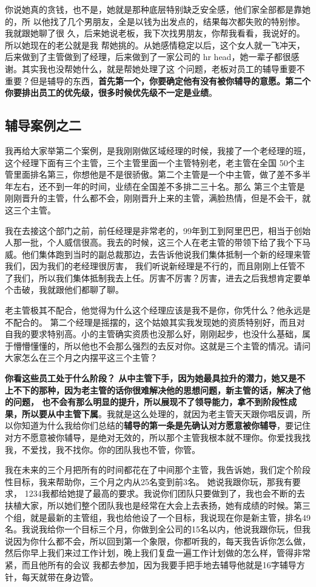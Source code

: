 \documentclass[12pt]{article}
\begin{document}
你说她真的贪钱，也不是，她就是那种底层特别缺乏安全感，他们家全部都是靠她的，所 以他找了几个男朋友，全是以钱为出发点的，结果每次都失败的特别惨。 我就跟她聊了很 久，后来她说老板，我下次找男朋友，你帮我看看，我说好的。所以她现在的老公就是我 帮她挑的。从她感情稳定以后，这个女人就一飞冲天，后来做到了主管做到了经理，后来做到了一家公司的 hr head，她一辈子都很感谢。其实我也没帮她什么，就是帮她处理了这 个问题，老板对员工的辅导重要不重要？但是辅导的东西，\textbf{首先第一个，你要确定他有没有被你辅导的意愿。第二个你要排出员工的优先级，很多时候优先级不一定是业绩}。

\subsection{辅导案例之二}
我再给大家举第二个案例，是我刚刚做区域经理的时候，我接了一个老经理的班，这个经理下面有三个主管，三个主管里面一个主管特别老，老主管在全国 50个主管里面排名第三，你想他是不是很骄傲。第二个主管是一个中主管，做了差不多半年左右，还不到一年的时间，业绩在全国差不多排二三十名。那么 第三个主管是刚刚晋升的主管，什么都不会，刚刚晋升上来的主管，满脸热情，但是不会干，就这三个主管。

我在去接这个部门之前，前任经理是非常老的，99年到工到阿里巴巴，相当于创始人那一批，个人威信很高。我去的时候，这三个人在老主管的带领下给了我个下马威。他们集体跑到当时的副总裁那边，去告诉他说我们集体抵制一个新的经理来管我们，因为我们的老经理很厉害， 我们听说新经理是不行的，而且刚刚上任管不了我们，所以我们集体抵制我去上任。厉害不厉害？厉害，进去之后我想肯定要单个击破，我就跟他们都聊了聊。

老主管极其不配合，他觉得为什么这个经理应该是我不是你，你凭什么？他永远是不配合的。 第二个经理是摇摆的，这个姑娘其实我发现她的资质特别好，而且对自我的要求特别高。小的主管确实资质也没那么好，刚刚起步，也没什么基础，属于懵懵懂懂的，所以他也不会那么强烈的去反对你。这就是三个主管的情况。请问大家怎么在三个月之内摆平这三个主管？

\textbf{你看这些员工处于什么阶段？ 从中主管下手，因为她最具拉升的潜力，她又是不上不下的那种，因为老主管的话你很难解决他的思想问题，新主管的话，解决了他的问题， 也不会有那么明显的提升，所以展现不了领导能力，拿不到阶段性成果，所以要从中主管下属}。我就是这么处理的，就因为老主管天天跟你唱反调，所以你知道为什么我给你们总结的\textbf{辅导的第一条是先确认对方愿意被你辅导}，要记住对方不愿意被你辅导，是绝对无效的，所以那个主管我根本就不理你。你爱找我找我，不爱找，我不找你。你的团队我也不管，你管。

我在未来的三个月把所有的时间都花在了中间那个主管，我告诉她，我们定个阶段性目标，我来帮助你，三个月之内从25名变到前3名。 她说我跟你玩，那我有要求， 1234我都给她提了最高的要求。我说你们团队只要做到了，我也会不断的去扶植大家，所以她们整个团队我也是经常在大会上去表扬，她有成绩的时候。第三个组，就是最新的主管组，我也给他设了一个目标，我说现在你是新主管，排名49名。我说我给你一个目标三个月，你做到全公司的15名以内，他说我跟你玩，但我说因为你什么都不会，所以回到第一个象限，你都听我的，每天我告诉你怎么做，然后你早上我们来过工作计划，晚上我们复盘一遍工作计划做的怎么样，管得非常紧，而且他所有的会议 我都去参加，因为我要手把手地去辅导他就是16字辅导方针，每天就带在身边管。
\end{document}
